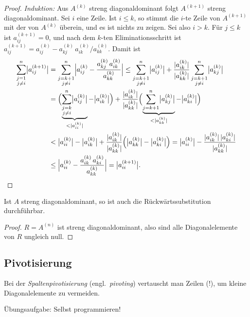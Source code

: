 \documentclass[11pt]{article}
\begin{document}
\begin{ergaenzung}
\begin{proof}
  \textit{Induktion:} Aus $A^{(k)}$ streng diagonaldominant folgt $A^{(k+1)}$ streng diagonaldominant. Sei $i$ eine Zeile. Ist $i \le k$, so stimmt die $i$-te Zeile von $A^{(k+1)}$ mit der von $A^{(k)}$ überein, und es ist nichts zu zeigen. Sei also $i > k$. Für $j \le k$ ist $a^{(k+1)}_{ij} = 0$, und nach dem $k$-ten Eliminationsschritt ist $a^{(k+1)}_{ij} = a^{(k)}_{ij} - a^{(k)}_{kj}\, a^{(k)}_{ik} / a^{(k)}_{kk}$. Damit ist
  \begin{align*}
    \sum_{\substack{j=1 \\ j \neq i}}^{n} \bigl\lvert a^{(k+1)}_{ij} \bigr\rvert
    &= \sum_{\substack{j=k+1 \\ j \neq i}}^{n} \Bigl\lvert a^{(k)}_{ij} - \frac{a^{(k)}_{kj}\, a^{(k)}_{ik}}{a^{(k)}_{kk}} \Bigr\rvert
    \le \sum_{\substack{j=k+1 \\ j \neq i}}^{n} \bigl\lvert a^{(k)}_{ij} \bigr\rvert + \frac{\lvert a^{(k)}_{ik} \rvert}{\lvert a^{(k)}_{kk} \rvert} \sum_{\substack{j=k+1 \\ j \neq i}}^{n} \bigl\lvert a^{(k)}_{kj} \bigr\rvert \\
    &= \Bigl( \underbrace{\sum_{\substack{j=k \\ j \neq i}}^{n} \bigl\lvert a^{(k)}_{ij} \bigr\rvert}_{< \lvert a^{(k)}_{ii} \rvert} - \bigl\lvert a^{(k)}_{ik} \bigr\rvert \Bigr)
      + \frac{\lvert a^{(k)}_{ik} \rvert}{\lvert a^{(k)}_{kk} \rvert} \Bigl( \underbrace{\sum_{j=k+1}^{n} \bigl\lvert a^{(k)}_{kj} \bigr\rvert}_{< \lvert a^{(k)}_{kk} \rvert} - \bigl\lvert a^{(k)}_{ki} \bigr\rvert \Bigr) \\
    &< \bigl\lvert a^{(k)}_{ii} \bigr\rvert - \bigl\lvert a^{(k)}_{ik} \bigr\rvert + \frac{\lvert a^{(k)}_{ik} \rvert}{\lvert a^{(k)}_{kk} \rvert} \Bigl( \bigl\lvert a^{(k)}_{kk} \bigr\rvert - \bigl\lvert a^{(k)}_{ki} \bigr\rvert \Bigr)
    = \bigl\lvert a^{(k)}_{ii} \bigr\rvert - \frac{\lvert a^{(k)}_{ik} \rvert\, \lvert a^{(k)}_{ki} \rvert}{\lvert a^{(k)}_{kk} \rvert} \\
    &\le \Bigl\lvert a^{(k)}_{ii} - \frac{a^{(k)}_{ik}\, a^{(k)}_{ki}}{a^{(k)}_{kk}} \Bigr\rvert = \bigl\lvert a^{(k+1)}_{ii} \bigr\rvert. \qedhere
  \end{align*}
\end{proof}

\begin{corollary}[Rückwärtssubstitution]\Theorem
  Ist $A$ streng diagonaldominant, so ist auch die Rückwärtssubstitution durchführbar.
\end{corollary}

\begin{proof}
  $R = A^{(n)}$ ist streng diagonaldominant, also sind alle Diagonalelemente von $R$ ungleich null.
\end{proof}
\end{ergaenzung}


\subsection{Pivotisierung}

Bei der \emph{Spaltenpivotisierung} (engl.\ \textit{pivoting}) vertauscht man Zeilen (!), um kleine Diagonalelemente zu vermeiden.


Übungsaufgabe: Selbst programmieren!




\PropertyNotice
\end{document}
